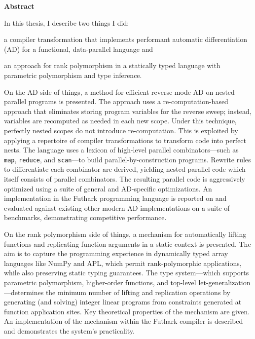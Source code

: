 
\begin{center}
\textbf{Abstract}
\end{center}
In this thesis, I describe two things I did:
\begin{enumerate*}[label=\arabic*)]
\item a compiler transformation that
implements performant automatic differentiation (AD) for a functional,
data-parallel language and
\item an approach for rank polymorphism in a statically typed language with
  parametric polymorphism and type inference.
\end{enumerate*}

On the AD side of things, a method for efficient reverse mode AD on nested
parallel programs is presented. The approach uses a re-computation-based approach
that eliminates storing program variables for the reverse sweep; instead,
variables are recomputed as needed in each new scope. Under this technique,
perfectly nested scopes do not introduce re-computation. This is exploited by
applying a repertoire of compiler transformations to transform code into perfect
nests.
%
The language uses a lexicon of high-level parallel combinators---such as
\texttt{map}, \texttt{reduce}, and \texttt{scan}---to build
parallel-by-construction programs. Rewrite rules to differentiate each
combinator are derived, yielding nested-parallel code which itself consists of
parallel combinators. The resulting parallel code is aggressively optimized
using a suite of general and AD-specific optimizations.
%
An implementation in the Futhark programming language is reported on and
evaluated against existing other modern AD implementations on a suite of
benchmarks, demonstrating competitive performance.

On the rank polymorphism side of things, a mechanism for automatically lifting
functions and replicating function arguments in a static context is
presented. The aim is to capture the programming experience in dynamically typed
array languages like NumPy and APL, which permit rank-polymorphic applications,
while also preserving static typing guarantees. The type system---which supports
parametric polymorphism, higher-order functions, and top-level
let-generalization---determines the minimum number of lifting and replication
operations by generating (and solving) integer linear programs from constraints
generated at function application sites. Key theoretical properties of the
mechanism are given. An implementation of the mechanism within the Futhark
compiler is described and demonstrates the system's practicality.

